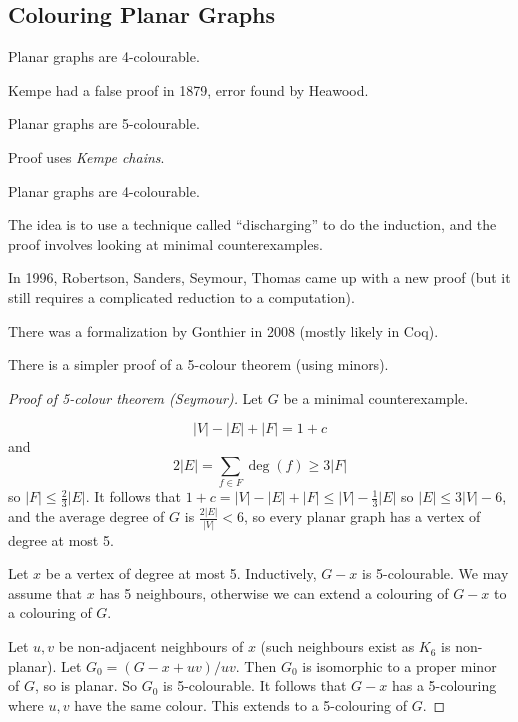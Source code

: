 \documentclass[main.tex]{subfiles}
\begin{document}
\subsection{Colouring Planar Graphs}
\begin{conjecture}[Guthrie 1952]%
  Planar graphs are 4-colourable.
\end{conjecture}
Kempe had a false proof in 1879, error found by Heawood.
\begin{theorem}[Heawood 1922]
  Planar graphs are 5-colourable.
\end{theorem}
Proof uses \textit{Kempe chains}.
\begin{theorem}
  Planar graphs are 4-colourable.
\end{theorem}
The idea is to use a technique called ``discharging'' to do the induction,
and the proof involves looking at minimal counterexamples.

In 1996, Robertson, Sanders, Seymour, Thomas came up with a new proof
(but it still requires a complicated reduction to a computation).

There was a formalization by Gonthier in 2008 (mostly likely in Coq).

There is a simpler proof of a 5-colour theorem (using minors).
\begin{proof}[Proof of 5-colour theorem (Seymour)]
  Let $G$ be a minimal counterexample.
  \begin{fact*}
    \leavevmode\vspace{-0.5em}
    \[
      |V| - |E| + |F| = 1 + c
    \]
    and
    \[
      2|E| = \sum_{f\in F}\deg(f)\geq 3|F|
    \]
    so $|F|\leq\frac 2 3|E|$.
    It follows that $1 + c = |V| - |E| + |F|\leq|V| - \frac 1 3|E|$ so
    $|E|\leq 3|V| - 6$, and the average degree of $G$ is $\frac{2|E|}{|V|} < 6$,
    so every planar graph has a vertex of degree at most 5.
  \end{fact*}
  Let $x$ be a vertex of degree at most 5.
  Inductively, $G - x$ is 5-colourable.
  We may assume that $x$ has 5 neighbours, otherwise we can extend a colouring
  of $G - x$ to a colouring of $G$.

  Let $u,v$ be non-adjacent neighbours of $x$ (such neighbours exist as $K_6$
  is non-planar).
  Let $G_0 = (G - x + uv)/uv$.
  Then $G_0$ is isomorphic to a proper minor of $G$, so is planar.
  So $G_0$ is 5-colourable.
  It follows that $G-x$ has a 5-colouring where $u, v$ have the same colour.
  This extends to a 5-colouring of $G$.
\end{proof}
\end{document}
